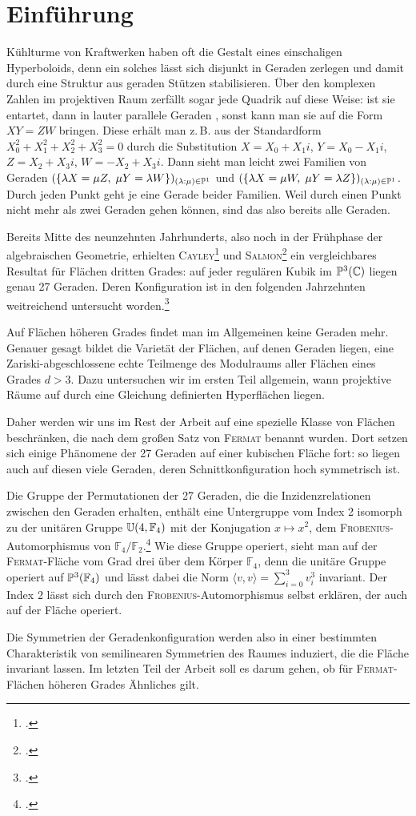 \chapter{Einführung} \label{chap:intro}
Kühlturme von Kraftwerken haben oft die Gestalt eines einschaligen Hyperboloids, denn ein solches lässt sich disjunkt in Geraden zerlegen und damit durch eine Struktur aus geraden Stützen stabilisieren. Über den komplexen Zahlen im projektiven Raum zerfällt sogar jede Quadrik auf diese Weise: ist sie entartet, dann in lauter parallele Geraden       , sonst kann man sie auf die Form $XY = ZW$ bringen. Diese erhält man z.\,B. aus der Standardform $X_0^2+X_1^2+X_2^2+X_3^2=0$ durch die Substitution $X = X_0 + X_1i$, $Y = X_0 - X_1i$, $Z = X_2 + X_3i$, $W = - X_2 + X_3i$. Dann sieht man leicht zwei Familien von Geraden $(\{\lambda X = \mu Z,\; \mu Y = \lambda W\})_{(\lambda:\mu) \in \mathbb P^{1}}$ und $(\{\lambda X = \mu W,\; \mu Y = \lambda Z\})_{(\lambda:\mu) \in \mathbb P^{1}}$. Durch jeden Punkt geht je eine Gerade beider Familien. Weil durch einen Punkt nicht mehr als zwei Geraden gehen können, sind das also bereits alle Geraden.

Bereits Mitte des neunzehnten Jahrhunderts, also noch in der Frühphase der algebraischen Geometrie, erhielten \textsc{Cayley}\footcite{Cayley} und \textsc{Salmon}\footcite{Salmon} ein vergleichbares Resultat für Flächen dritten Grades: auf jeder regulären Kubik im $\mathbb P^{3}(\mathbb C)$ liegen genau 27 Geraden. Deren Konfiguration ist in den folgenden Jahrzehnten weitreichend untersucht worden.\footcite[siehe etwa][]{Henderson}

Auf Flächen höheren Grades findet man im Allgemeinen keine Geraden mehr. Genauer gesagt bildet die Varietät der Flächen, auf denen Geraden liegen, eine Zariski-abgeschlossene echte Teilmenge des Modulraums aller Flächen eines Grades $d > 3$. Dazu untersuchen wir im ersten Teil allgemein, wann projektive Räume auf durch eine Gleichung definierten Hyperflächen liegen.

Daher werden wir uns im Rest der Arbeit auf eine spezielle Klasse von Flächen beschränken, die nach dem großen Satz von \textsc{Fermat} benannt wurden. Dort setzen sich einige Phänomene der 27 Geraden auf einer kubischen Fläche fort: so liegen auch auf diesen viele Geraden, deren Schnittkonfiguration hoch symmetrisch ist.

Die Gruppe der Permutationen der 27 Geraden, die die Inzidenzrelationen zwischen den Geraden erhalten, enthält eine Untergruppe vom Index 2 isomorph zu der unitären Gruppe $\mathbb U(4,\mathbb F_4)$ mit der Konjugation $x \mapsto x^2$, dem \textsc{Frobenius}-Automorphismus von $\mathbb F_4/\mathbb F_2$.\footcite[Aufg.~C--D, S.~180]{Mumford} Wie diese Gruppe operiert, sieht man auf der \textsc{Fermat}-Fläche vom Grad drei über dem Körper $\mathbb F_4$, denn die unitäre Gruppe operiert auf $\mathbb P^{3}(\mathbb F_4)$ und lässt dabei die Norm $\langle v, v \rangle = \sum_{i=0}^3 v_i^3$ invariant. Der Index 2 lässt sich durch den \textsc{Frobenius}-Automorphismus selbst erklären, der auch auf der Fläche operiert.

Die Symmetrien der Geradenkonfiguration werden also in einer bestimmten Charakteristik von semilinearen Symmetrien des Raumes induziert, die die Fläche invariant lassen. Im letzten Teil der Arbeit soll es darum gehen, ob für \textsc{Fermat}-Flächen höheren Grades Ähnliches gilt.
